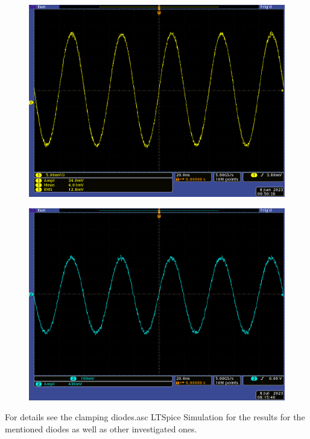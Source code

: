 \begin{figure}[hbt]
    \centering
    \includegraphics{images/protection_diode_input_100mVpp_attentuation.png}
    \caption{ }
\end{figure}

\begin{figure}[hbt]
    \centering
    \includegraphics{images/protection_diode_input_500mVpp_working.png}
    \caption{ }
\end{figure}

For details see the clamping diodes.asc LTSpice Simulation for the results for the mentioned diodes as well as other investigated ones.

